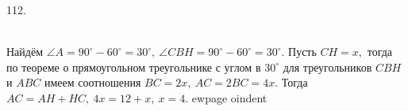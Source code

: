 112. \begin{figure}[ht!]
\end{figure}\\
Найдём $\angle A=90^\circ-60^\circ=30^\circ,\ \angle CBH=90^\circ-60^\circ=30^\circ.$ Пусть $CH=x,$ тогда по теореме о прямоугольном треугольнике с углом в $30^\circ$ для треугольников $CBH$ и $ABC$ имеем соотношения $BC=2x,\ AC=2BC=4x.$ Тогда $AC=AH+HC,\ 4x=12+x,\ x=4.$
ewpage
oindent
